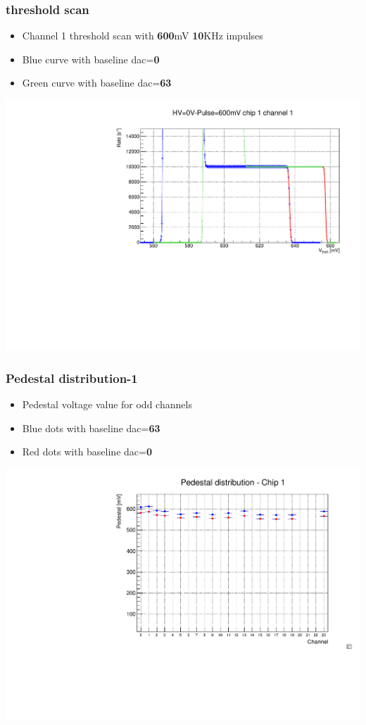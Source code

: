 \documentclass[aspectratio=169]{beamer}
\begin{document}
	\begin{frame}
	\frametitle{threshold scan}
		\begin{itemize}
			\item Channel 1 threshold scan with \textbf{600}mV \textbf{10}KHz impulses
			\item {\color{blue}Blue} curve with baseline dac=\textbf{0}
			\item {\color{green}Green} curve with baseline dac=\textbf{63}  
		\end{itemize}	
		\begin{center}
			\includegraphics[width=0.65 \textwidth]{IMG/ThScan_ch0.pdf}
		\end{center}
		
	\end{frame}

	\begin{frame}
	\frametitle{Pedestal distribution-1}
	\begin{itemize}
		\item Pedestal voltage value for odd channels
		\item {\color{blue}Blue} dots with baseline dac=\textbf{63}
		\item {\color{red}Red} dots with baseline dac=\textbf{0}
	\end{itemize}
	\begin{center}
		\includegraphics[width=0.59 \textwidth]{data/DAC_V_REF_600mV.pdf}
	\end{center}
	
	\end{frame}
\end{document}
